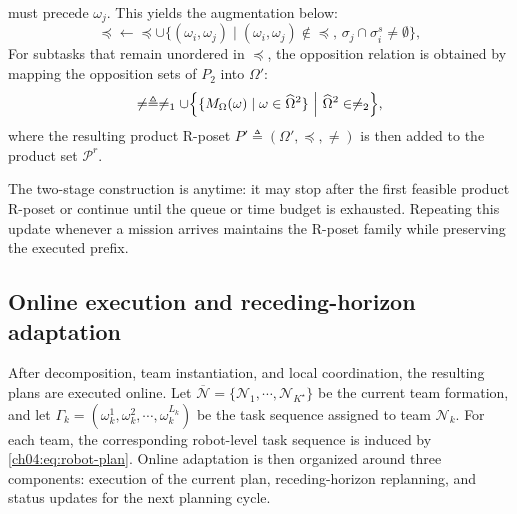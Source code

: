 must precede $\omega_j$. This yields the augmentation below:
\begin{equation}
\label{ch04:eq:neq_update}
\preceq \leftarrow
\preceq \cup
\bigl\{
(\omega_i,\omega_j)\mid
(\omega_i,\omega_j)\notin\preceq,\,
\sigma_j\cap\sigma_i^s\neq\emptyset
\bigr\},
\end{equation}
For subtasks that remain unordered in $\preceq$, the opposition
relation is obtained by mapping the opposition sets of $P_2$ into $\Omega'$:
\begin{equation}
\label{ch04:eq:neq_calculate}
\neq \triangleq
\neq_1 \cup
\Bigl\{
\{M_{\Omega}(\omega)\mid \omega\in\widehat{\Omega}^2\}
\ \Big|\
\widehat{\Omega}^2\in\neq_2
\Bigr\},
\end{equation}
where the resulting product R-poset
$P' \triangleq (\Omega',\preceq,\neq)$ is then added to the product set
$\mathcal{P}^{r}$.

The two-stage construction is anytime: it may stop after the first feasible
product R-poset or continue until the queue or time budget is exhausted. Repeating
this update whenever a mission arrives maintains the R-poset family while
preserving the executed prefix.









\subsection{Online execution and receding-horizon adaptation}
\label{ch04:subsec:online_execution}

After decomposition, team instantiation, and local coordination, the resulting
plans are executed online. Let
$\overline{\mathcal{N}}=\{\mathcal{N}_1,\cdots,\mathcal{N}_{K^\star}\}$ be the
current team formation, and let
$\Gamma_k=(\omega_k^1,\omega_k^2,\cdots,\omega_k^{L_k})$ be the task sequence
assigned to team $\mathcal{N}_k$. For each team, the corresponding robot-level
task sequence is induced by \eqref{ch04:eq:robot-plan}. Online adaptation is
then organized around three components: execution of the current plan,
receding-horizon replanning, and status updates for the next planning
cycle.

